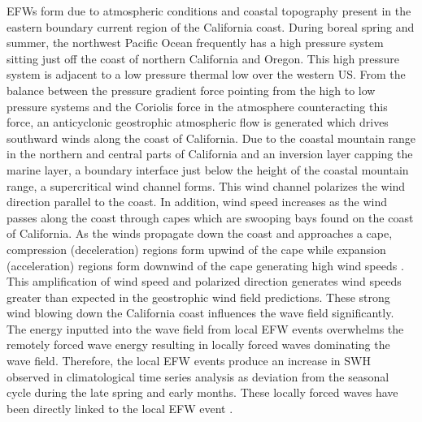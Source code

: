 \documentclass[12pt,twoside]{article}
\begin{document}
EFWs form due to atmospheric conditions and coastal topography present in the eastern boundary current region of the California coast. During boreal spring and summer, the northwest Pacific Ocean frequently has a high pressure system sitting just off the coast of northern California and Oregon. This high pressure system is adjacent to a low pressure thermal low over the western US. From the balance between the pressure gradient force pointing from the high to low pressure systems and the Coriolis force in the atmosphere counteracting this force, an anticyclonic geostrophic atmospheric flow is generated which drives southward winds along the coast of California. Due to the coastal mountain range in the northern and central parts of California and an inversion layer capping the marine layer, a boundary interface just below the height of the coastal mountain range, a supercritical wind channel forms. This wind channel polarizes the wind direction parallel to the coast. In addition, wind speed increases as the wind passes along the coast through capes which are swooping bays found on the coast of California. As the winds propagate down the coast and approaches a cape, compression (deceleration) regions form upwind of the cape while expansion (acceleration) regions form downwind of the cape generating high wind speeds \citealp{winant1988marine,taylor2008northerly}. This amplification of wind speed and polarized direction generates wind speeds greater than expected in the geostrophic wind field predictions. These strong wind blowing down the California coast influences the wave field significantly. The energy inputted into the wave field from local EFW events overwhelms the remotely forced wave energy resulting in locally forced waves dominating the wave field. Therefore, the local EFW events produce an increase in SWH observed in climatological time series analysis as deviation from the seasonal cycle during the late spring and early months. These locally forced waves have been directly linked to the local EFW event \cite{villas2017characterization}.


\end{document}

